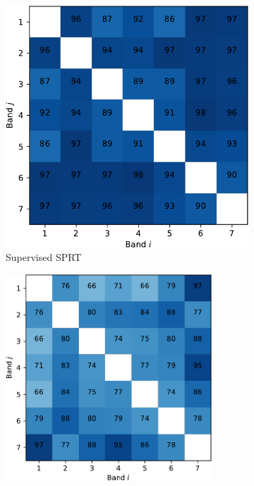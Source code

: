 \documentclass{article}
\begin{document}
\begin{figure}[h] 
  \begin{subfigure}[b]{0.49\linewidth}
    \centering
    \includegraphics[width=0.85\linewidth]{sup-crop.pdf} 
    \caption{Supervised SPRT} 
    \label{fig7:a} 
  \end{subfigure}%
  \begin{subfigure}[b]{0.49\linewidth}
    \centering
    \includegraphics[width=0.85\textwidth]{un-crop.pdf} 

\end{subfigure}
\end{figure}
\end{document}
